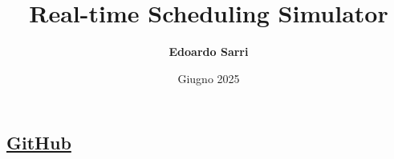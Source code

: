 \title{Real-time Scheduling Simulator}
\subsection{\href{https://github.com/edoardosarri24/real-time-scheduling-simulator.git}{GitHub}}
\author[Edoardo Sarri]{\textbf{Edoardo Sarri}}
\date{Giugno 2025}
